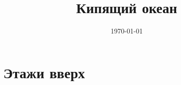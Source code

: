 \documentclass[11pt,a4paper,twoside,openright]{book}
\title{Кипящий океан}
\author{}
\date{\today}
\begin{document}











\part{Этажи вверх}








\appendix

\end{document}
